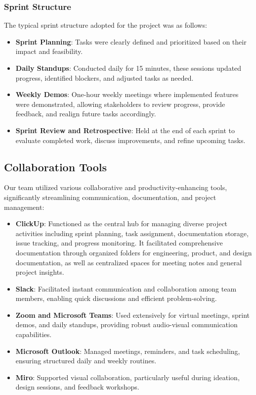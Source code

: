 \subsubsection{Sprint Structure}
The typical sprint structure adopted for the project was as follows:
\begin{itemize}
    \item \textbf{Sprint Planning}: Tasks were clearly defined and prioritized based on their impact and feasibility.
    \item \textbf{Daily Standups}: Conducted daily for 15 minutes, these sessions updated progress, identified blockers, and adjusted tasks as needed.
    \item \textbf{Weekly Demos}: One-hour weekly meetings where implemented features were demonstrated, allowing stakeholders to review progress, provide feedback, and realign future tasks accordingly.
    \item \textbf{Sprint Review and Retrospective}: Held at the end of each sprint to evaluate completed work, discuss improvements, and refine upcoming tasks.
\end{itemize}

\subsection{ Collaboration Tools}
Our team utilized various collaborative and productivity-enhancing tools, significantly streamlining communication, documentation, and project management:

\begin{itemize}
    \item \textbf{ClickUp}: Functioned as the central hub for managing diverse project activities including sprint planning, task assignment, documentation storage, issue tracking, and progress monitoring. It facilitated comprehensive documentation through organized folders for engineering, product, and design documentation, as well as centralized spaces for meeting notes and general project insights.
    \item \textbf{Slack}: Facilitated instant communication and collaboration among team members, enabling quick discussions and efficient problem-solving.
    \item \textbf{Zoom and Microsoft Teams}: Used extensively for virtual meetings, sprint demos, and daily standups, providing robust audio-visual communication capabilities.
    \item \textbf{Microsoft Outlook}: Managed meetings, reminders, and task scheduling, ensuring structured daily and weekly routines.
    \item \textbf{Miro}: Supported visual collaboration, particularly useful during ideation, design sessions, and feedback workshops.
\end{itemize}

